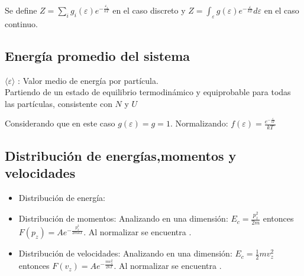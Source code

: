 \documentclass[oneside]{book}
\numberwithin{equation}{section}
\numberwithin{figure}{section}
\numberwithin{table}{section}
\begin{document}
				Se define  $\displaystyle Z=\sum_i g_i(\varepsilon) e^{-\frac{\varepsilon_i}{kT}}$ en el caso discreto y $\displaystyle Z=\int_\varepsilon g(\varepsilon) e^{-\frac{\varepsilon}{kT}}d\varepsilon$ en el caso continuo.
			
			\subsection{Energía promedio del sistema}
	
				$\displaystyle \langle\varepsilon\rangle$	: Valor medio de energía por partícula.\\
				
				Partiendo de un estado de equilibrio termodinámico y equiprobable para todas las partículas, consistente con $N$ y $U$				
				
				Considerando que en este caso $g(\varepsilon)=g=1$. Normalizando: $\displaystyle f(\varepsilon)=\frac{e^{-\frac{\varepsilon}{kT}}}{kT}$\\
				
				\begin{center}
				\end{center}
			
			\subsection{Distribución de energías,momentos y velocidades}
			
				\begin{itemize}
					\item Distribución de energía: 
								
					\item Distribución de momentos: Analizando en una dimensión: $E_c=\frac{p_z^2}{2m}$ entonces $\displaystyle F(p_z)=A e^{-\frac{ p_z^2}{2mkT}}$. Al normalizar se encuentra .
					
					\item Distribución de velocidades: Analizando en una dimensión: $E_c=\frac{1}{2}m v_z^2$ entonces $\displaystyle F(v_z)=A e^{-\frac{m v_z^2}{2kT}}$. Al normalizar se encuentra .
				\end{itemize}
			
\end{document}
